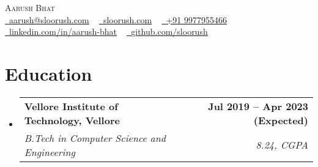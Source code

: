 \documentclass[a4paper,11pt]{article}
\makeatletter
\newcommand{\resumeSubheading}[4]{
  \vspace{-2pt}\item
    \begin{tabular*}{1.0\textwidth}[t]{l@{\extracolsep{\fill}}r}
      \textbf{#1} & \textbf{\small #2} \\
      \textit{\small#3} & \textit{\small #4} \\
    \end{tabular*}\vspace{-7pt}
}
\newcommand{\resumeSubHeadingListStart}{\begin{itemize}[leftmargin=0.0in, label={}]}
\newcommand{\resumeSubHeadingListEnd}{\end{itemize}}
\makeatother
\begin{document}

\begin{center}
    {\Huge \scshape Aarush Bhat} \\ \vspace{8pt}
    \small 
    \href{mailto:aarush@sloorush.com}{\raisebox{-0.2\height}\faEnvelope\  \underline{aarush@sloorush.com}} ~ 
    \href{https://sloorush.com}{\raisebox{-0.2\height}\faLink\   \underline{sloorush.com}} ~
    \href{tel://+919977955466}{\raisebox{-0.2\height}\faPhone\   \underline{+91 9977955466}} ~
    \href{https://linkedin.com/in/aarush-bhat/}{\raisebox{-0.2\height}\faLinkedin\ \underline{linkedin.com/in/aarush-bhat}}  ~
    \href{https://github.com/sloorush}{\raisebox{-0.2\height}\faGithub\ \underline{github.com/sloorush}}
    \vspace{-8pt}
\end{center}


\section{Education}
  \resumeSubHeadingListStart
    \resumeSubheading
      {Vellore Institute of Technology, Vellore}{Jul 2019 -- Apr 2023 (Expected)}
      {B.Tech in Computer Science and Engineering}{8.24, CGPA}
  \resumeSubHeadingListEnd
  
\end{document}

